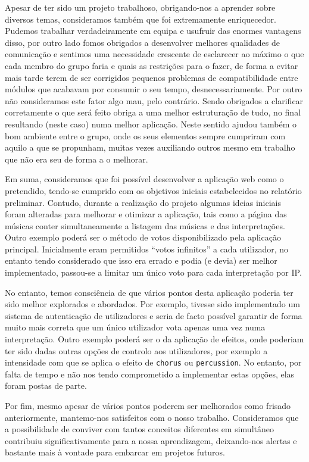 \documentclass[a4paper,11pt,openright,oneside]{report}
\begin{document}
Apesar de ter sido um projeto trabalhoso, obrigando-nos a aprender sobre diversos temas, consideramos também que foi extremamente enriquecedor. Pudemos trabalhar verdadeiramente em equipa e usufruir das enormes vantagens disso, por outro lado fomos obrigados a desenvolver melhores qualidades de comunicação e sentimos uma necessidade crescente de esclarecer ao máximo o que cada membro do grupo faria e quais as restrições para o fazer, de forma a evitar mais tarde terem de ser corrigidos pequenos problemas de compatibilidade entre módulos que acabavam por consumir o seu tempo, desnecessariamente. Por outro não consideramos este fator algo mau, pelo contrário. Sendo obrigados a clarificar corretamente o que será feito obriga a uma melhor estruturação de tudo, no final resultando (neste caso) numa melhor aplicação. Neste sentido ajudou também o bom ambiente entre o grupo, onde os seus elementos sempre cumpriram com aquilo a que se propunham, muitas vezes auxiliando outros mesmo em trabalho que não era seu de forma a o melhorar.

Em suma, consideramos que foi possível desenvolver a aplicação web como o pretendido, tendo-se cumprido com os objetivos iniciais estabelecidos no relatório preliminar. Contudo, durante a realização do projeto algumas ideias iniciais foram alteradas para melhorar e otimizar a aplicação, tais como a página das músicas conter simultaneamente a listagem das músicas e das interpretações. Outro exemplo poderá ser o método de votos disponibilizado pela aplicação principal. Inicialmente eram permitidos ``votos infinitos'' a cada utilizador, no entanto tendo considerado que isso era errado e podia (e devia) ser melhor implementado, passou-se a limitar um único voto para cada interpretação por IP.

No entanto, temos consciência de que vários pontos desta aplicação poderia ter sido melhor explorados e abordados. Por exemplo, tivesse sido implementado um sistema de autenticação de utilizadores e seria de facto possível garantir de forma muito mais correta que um único utilizador vota apenas uma vez numa interpretação. Outro exemplo poderá ser o da aplicação de efeitos, onde poderiam ter sido dadas outras opções de controlo aos utilizadores, por exemplo a intensidade com que se aplica o efeito de \verb|chorus| ou \verb|percussion|. No entanto, por falta de tempo e não nos tendo comprometido a implementar estas opções, elas foram postas de parte.

Por fim, mesmo apesar de vários pontos poderem ser melhorados como frisado anteriormente, mantemo-nos satisfeitos com o nosso trabalho. Consideramos que a possibilidade de conviver com tantos conceitos diferentes em simultâneo contribuiu significativamente para a nossa aprendizagem, deixando-nos alertas e bastante mais à vontade para embarcar em projetos futuros.

\fi

\maketitle
\nocite{*}
\printbibliography[title={Referências}]
\end{document}
